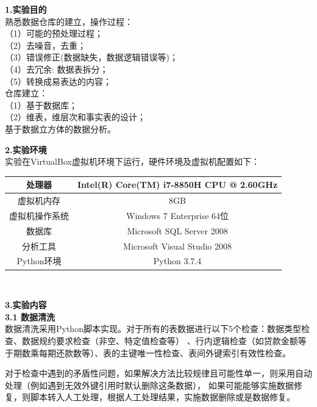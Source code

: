 \documentclass[a4paper]{article}
\begin{document}
\courseheader
{}

\info

\begin{enumerate}
  \setlength{\itemsep}{3\parskip}
  \textbf{1.实验目的}\\
  熟悉数据仓库的建立，操作过程：\\
  （1）可能的预处理过程；\\
  （2）去噪音，去重；\\
  （3）错误修正(数据缺失，数据逻辑错误等)；\\
  （4）去冗余: 数据表拆分；\\
  （5）转换成易表达的内容；\\
  仓库建立：\\
  （1）基于数据库；\\
  （2）维表，维层次和事实表的设计；\\
  基于数据立方体的数据分析。\\
  \bigskip

  \textbf{2.实验环境}\\
  实验在VirtualBox虚拟机环境下运行，硬件环境及虚拟机配置如下：\\ \medskip
  \begin{tabular}{c|c}
    \hline\hline
    处理器 & Intel(R) Core(TM) i7-8850H CPU @ 2.60GHz \\ \hline
    虚拟机内存 & 8GB\\ \hline
    虚拟机操作系统& Windows 7 Enterprise 64位\\ \hline
    数据库& Microsoft SQL Server 2008\\\hline
    分析工具& Microsoft Visual Studio 2008\\\hline
    Python环境& Python 3.7.4\\
    \hline\hline
  \end{tabular}\\
  \bigskip

  \textbf{3.实验内容}\\
  \textbf{3.1 数据清洗}\\
  \medskip
  数据清洗采用Python脚本实现。对于所有的表数据进行以下5个检查：数据类型检查、数据规约要求检查（非空、特定值检查等）
  、行内逻辑检查（如贷款金额等于期数乘每期还款数等）、表的主键唯一性检查、表间外键索引有效性检查。

  对于检查中遇到的矛盾性问题，如果解决方法比较规律且可能性单一，则采用自动处理（例如遇到无效外键引用时默认删除这条数据），
  如果可能能够实施数据修复，则脚本转入人工处理，根据人工处理结果，实施数据删除或是数据修复。


\end{enumerate}
\end{document}
